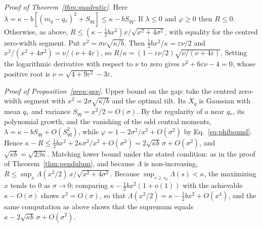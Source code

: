 \emph{Proof of Theorem~\ref{thm:quadratic}.} Here $\lambda = \kappa - b\left[(m_q - q_*)^2 + S_{qq}\right] \leq \kappa - bS_{qq}$. If $\lambda \leq 0$ and $\varphi \geq 0$ then $R \leq 0$. Otherwise, as above, $R \leq \left(\kappa - \tfrac12 bx^2\right)x/\sqrt{x^2 + 4\sigma^2}$, with equality for the centred zero-width segment. Put $x^2 = \sigma\nu\sqrt{\kappa/b}$. Then $\tfrac12 bx^2/\kappa = \varepsilon\nu/2$ and $x^2/(x^2 + 4\sigma^2) = \nu/(\nu + 4\varepsilon)$, so $R/\kappa = (1 - \varepsilon\nu/2)\sqrt{\nu/(\nu + 4\varepsilon)}$. Setting the logarithmic derivative with respect to $\nu$ to zero gives $\nu^2 + 6\varepsilon\nu - 4 = 0$, whose positive root is $\nu = \sqrt{4 + 9\varepsilon^2} - 3\varepsilon$.

\emph{Proof of Proposition~\ref{prop:gap}.} Upper bound on the gap: take the centred zero-width segment with $x^2 = 2\sigma\sqrt{\kappa/b}$ and the optimal tilt. Its $X_q$ is Gaussian with mean $q_*$ and variance $S_{qq} = x^2/2 = O(\sigma)$. By the regularity of $a$ near $q_*$, its polynomial growth, and the vanishing of the odd central moments, $\lambda = \kappa - bS_{qq} + O(S_{qq}^2)$, while $\varphi = 1 - 2\sigma^2/x^2 + O(\sigma^2)$ by Eq.~\eqref{eq:phibound}. Hence $\kappa - R \leq \tfrac12 bx^2 + 2\kappa\sigma^2/x^2 + O(\sigma^2) = 2\sqrt{\kappa b}\,\sigma + O(\sigma^2)$, and $\sqrt{\kappa b} = \sqrt{2\beta\kappa}$. Matching lower bound under the stated condition: as in the proof of Theorem~\ref{thm:pendulum}, and because $\Lambda$ is non-increasing, $R \leq \sup_x \Lambda(x^2/2)\,x/\sqrt{x^2 + 4\sigma^2}$. Because $\sup_{s \geq s_0}\Lambda(s) < \kappa$, the maximizing $x$ tends to $0$ as $\sigma \to 0$; comparing $\kappa - \tfrac12 bx^2(1 + o(1))$ with the achievable $\kappa - O(\sigma)$ shows $x^2 = O(\sigma)$, so that $\Lambda(x^2/2) = \kappa - \tfrac12 bx^2 + O(x^4)$, and the same computation as above shows that the supremum equals $\kappa - 2\sqrt{\kappa b}\,\sigma + O(\sigma^2)$.
